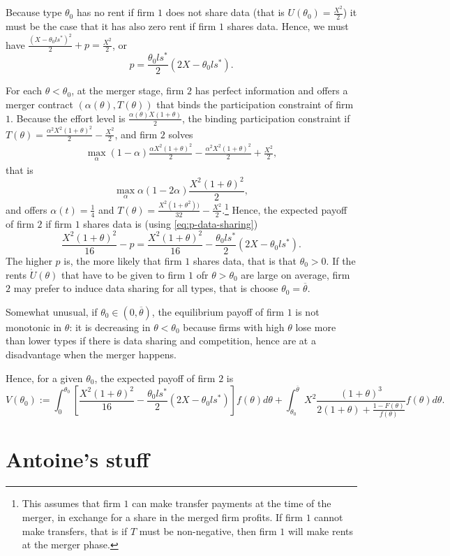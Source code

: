 \documentclass[a4paper]{article}
\renewcommand{\t}{\theta}
\renewcommand{\a}{\alpha}
\begin{document}
Because type $\t_0$ has no rent if firm $1$ does not share data (that is $U(\t_0)=\frac{X^2}{2}$) it must be the case that it has also zero rent if firm $1$ shares data. Hence, we must have $\frac{(X-\t_0 l s^*)^2}{2}+p=\frac{X^2}{2}$, or
%
\begin{equation}\label{eq:p-data-sharing}
    p=\frac{\t_0 l s^*}{2}(2X-\t_0 l s^*).   
\end{equation}

%
For each $\t<\t_0$, at the merger stage, firm $2$ has perfect information and offers a merger contract $(\a(\t),T(\t))$ that binds the participation constraint of firm $1$. Because the effort level is $\frac{\a(\t)X(1+\t)}{2}$, the binding participation constraint if  $T(\t)= \frac{\a^2X^2(1+\t)^2}{2}-\frac{X^2}{2}$, and firm $2$ solves
%
\begin{align*}
\max_{\a} (1-\a)\frac{\a X^2(1+\t)^2}{2}-\frac{\a^2X^2(1+\t)^2}{2}+\frac{X^2}{2},
\end{align*}
that is 
%
\[
\max_{\a} \a(1-2 \a)\frac{X^2(1+\t)^2}{2},
\]
%
and offers $\a(t)=\frac{1}{4}$ and $T(\t)= \frac{X^2(1+\t^2))}{32}-\frac{X^2}{2}$.\footnote{%
This assumes that firm $1$ can make transfer payments at the time of the merger, in exchange for a share in the merged firm profits. If firm $1$ cannot make transfers, that is if $T$ must be non-negative, then firm $1$ will make rents at the merger phase.
}
Hence, the expected payoff of firm $2$ if firm $1$ shares data is (using \eqref{eq:p-data-sharing})
%
\[
 \frac{X^2(1+\t)^2}{16}-p= \frac{X^2(1+\t)^2}{16}-\frac{\t_0 l s^*}{2}(2X-\t_0 l s^*).
\]
%
The  higher $p$ is, the more likely that firm $1$ shares data, that is that $\t_0>0$. If the rents $\dot U(\t)$ that have to be given to firm $1$ ofr $\t>\t_0$ are large on average, firm $2$ may prefer to induce data sharing for all types, that is choose $\t_0=\overline \t$.

Somewhat unusual, if $\t_0\in(0,\overline \t)$, the equilibrium payoff of firm $1$ is not monotonic in $\t$: it is decreasing in $\t<\t_0$ because firms with high $\t$ lose more than lower types if there is data sharing and competition, hence are at a disadvantage when the merger happens.

Hence, for a given $\t_0$, the expected payoff of firm $2$ is 
%
\[
V(\t_0):=\int_0^{\t_0} \left[\frac{X^2(1+\t)^2}{16}-\frac{\t_0 l s^*}{2}(2X-\t_0 l s^*)\right]f(\t)d\t + \int_{\t_0}^{\overline \t} X^2 \frac{(1+\t)^3}{2(1+\t)+\frac{1-F(\t)}{f(\t)}}f(\t)d\t.
\] 
%


\section{Antoine's stuff}
\end{document}

